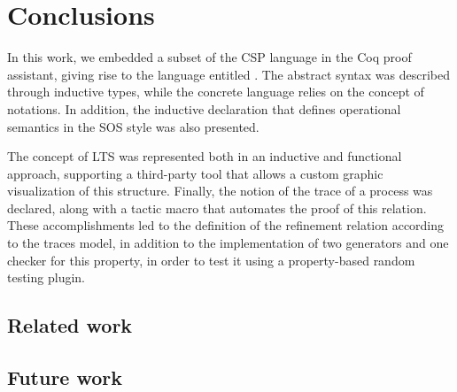 \chapter{Conclusions}

In this work, we embedded a subset of the CSP language in the Coq proof assistant, giving rise to the language entitled \CSPcoq{}. The abstract syntax was described through inductive types, while the concrete language relies on the concept of notations. In addition, the inductive declaration that defines operational semantics in the SOS style was also presented.

The concept of LTS was represented both in an inductive and functional approach, supporting a third-party tool that allows a custom graphic visualization of this structure. Finally, the notion of the trace of a process was declared, along with a tactic macro that automates the proof of this relation. These accomplishments led to the definition of the refinement relation according to the traces model, in addition to the implementation of two generators and one checker for this property, in order to test it using a property-based random testing plugin.

\section{Related work}

\section{Future work}

